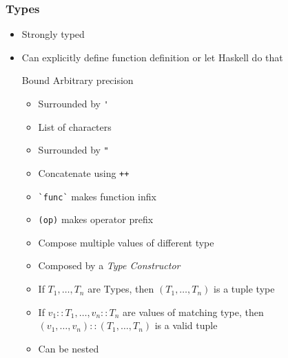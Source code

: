 \subsubsection{Types}
\begin{itemize}
    \item Strongly typed
    \item Can explicitly define function definition or let Haskell do that
        \begin{itemize}
             Bound
             Arbitrary precision
        \end{itemize}
        \begin{itemize}
            \item Surrounded by \verb+'+
        \end{itemize}
        \begin{itemize}
            \item List of characters
            \item Surrounded by \verb+"+
            \item Concatenate using \verb|++|
        \end{itemize}
        \begin{itemize}
             Binary function which is used infix
            \item \verb+`func`+ makes function infix
            \item \verb+(op)+ makes operator prefix
        \end{itemize}
        \begin{itemize}
            \item Compose multiple values of different type
            \item Composed by a \textit{Type Constructor}
            \item If $T_1, \dots, T_n$ are Types, then $(T_1, \dots , T_n)$ is a tuple type
            \item If $v_1 :: T_1, \dots, v_n :: T_n$ are values of matching type, then $(v_1, \dots , v_n) :: (T_1, \dots , T_n)$ is a valid tuple
            \item Can be nested
        \end{itemize}
\end{itemize}

